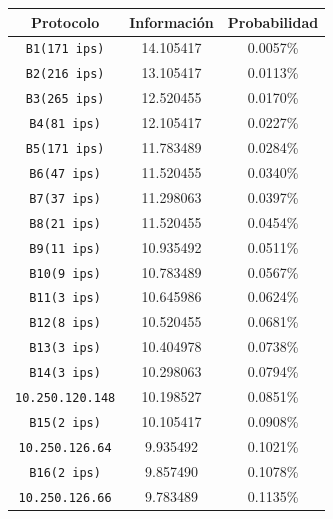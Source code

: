 \documentclass[final,inline,narroweqnarray,a4paper]{ieee}
\begin{document}
\begin{table}[H]
    \begin{center}
        \begin{tabular}{|c|c|c|}
            \hline
            \textbf{Protocolo} & \textbf{Información} & \textbf{Probabilidad} \\ \hline
            \texttt{B1(171 ips)}    &14.105417        & 0.0057\%     \\ \hline
            \texttt{B2(216 ips)}    &13.105417        & 0.0113\%     \\ \hline
            \texttt{B3(265 ips)}    &12.520455        & 0.0170\%     \\ \hline
            \texttt{B4(81 ips)}    &12.105417        & 0.0227\%     \\ \hline
            \texttt{B5(171 ips)}    &11.783489        & 0.0284\%     \\ \hline                                    
            \texttt{B6(47 ips)}    &11.520455        & 0.0340\%     \\ \hline
            \texttt{B7(37 ips)}    &11.298063        & 0.0397\%     \\ \hline
            \texttt{B8(21 ips)}    &11.520455        & 0.0454\%     \\ \hline
            \texttt{B9(11 ips)}    &10.935492 & 0.0511\%     \\ \hline
            \texttt{B10(9 ips)}    &10.783489 & 0.0567\%     \\ \hline
            \texttt{B11(3 ips)}    &10.645986 & 0.0624\%     \\ \hline
            \texttt{B12(8 ips)}    &10.520455 & 0.0681\%     \\ \hline
            \texttt{B13(3 ips)}    &10.404978 & 0.0738\%     \\ \hline                                                            
            \texttt{B14(3 ips)}    &10.298063 & 0.0794\%     \\ \hline
            \texttt{10.250.120.148}    &10.198527 & 0.0851\%     \\ \hline
            \texttt{B15(2 ips)}    &10.105417 &0.0908\%     \\ \hline
            \texttt{10.250.126.64}    &9.935492 &0.1021\%     \\ \hline                                                
            \texttt{B16(2 ips)}    &9.857490 &0.1078\%     \\ \hline
            \texttt{10.250.126.66}    &9.783489 &0.1135\%     \\ \hline

\end{tabular}
\end{center}
\end{table}
\end{document}
